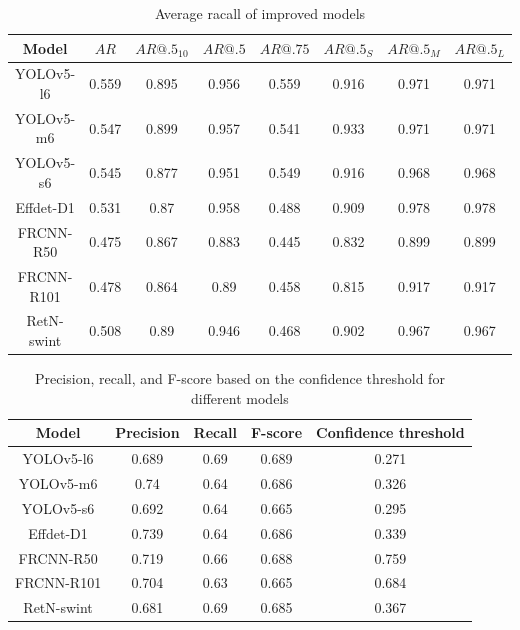 \begin{table}[h]
    \centering
    \begin{tabular}{|c|c|c|c|c|c|c|c|}
        \hline
        Model      & $AR$  & $AR@.5_{10}$ & $AR@.5$ & $AR@.75$ & $AR@.5_S$ & $AR@.5_M$ & $AR@.5_L$ \\ \hline
        YOLOv5-l6  & 0.559 & 0.895        & 0.956   & 0.559    & 0.916     & 0.971     & 0.971     \\ \hline
        YOLOv5-m6  & 0.547 & 0.899        & 0.957   & 0.541    & 0.933     & 0.971     & 0.971     \\ \hline
        YOLOv5-s6  & 0.545 & 0.877        & 0.951   & 0.549    & 0.916     & 0.968     & 0.968     \\ \hline
        Effdet-D1  & 0.531 & 0.87         & 0.958   & 0.488    & 0.909     & 0.978     & 0.978     \\ \hline
        FRCNN-R50  & 0.475 & 0.867        & 0.883   & 0.445    & 0.832     & 0.899     & 0.899     \\ \hline
        FRCNN-R101 & 0.478 & 0.864        & 0.89    & 0.458    & 0.815     & 0.917     & 0.917     \\ \hline
        RetN-swint & 0.508 & 0.89         & 0.946   & 0.468    & 0.902     & 0.967     & 0.967     \\ \hline
    \end{tabular}
    \caption{Average racall of improved models}
    \label{tab:improved:recall}
\end{table}


\begin{table}[h]
    \begin{tabular}{|c|c|c|c|c|}
        \hline
        Model      & Precision & Recall & F-score & Confidence threshold \\ \hline
        YOLOv5-l6  & 0.689     & 0.69   & 0.689   & 0.271                \\ \hline
        YOLOv5-m6  & 0.74      & 0.64   & 0.686   & 0.326                \\ \hline
        YOLOv5-s6  & 0.692     & 0.64   & 0.665   & 0.295                \\ \hline
        Effdet-D1  & 0.739     & 0.64   & 0.686   & 0.339                \\ \hline
        FRCNN-R50  & 0.719     & 0.66   & 0.688   & 0.759                \\ \hline
        FRCNN-R101 & 0.704     & 0.63   & 0.665   & 0.684                \\ \hline
        RetN-swint & 0.681     & 0.69   & 0.685   & 0.367                \\ \hline
    \end{tabular}
    \caption{Precision, recall, and F-score based on the confidence threshold for different models}
    \label{tab:imrpoved:prf}
\end{table}


